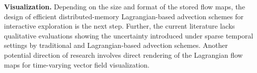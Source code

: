 \textbf{Visualization.} 
%
%
Depending on the size and format of the stored flow maps, the design of efficient distributed-memory Lagrangian-based advection schemes for interactive exploration is the next step.
%
Further, the current literature lacks qualitative evaluations showing the uncertainty introduced under sparse temporal settings by traditional and Lagrangian-based advection schemes.
%
Another potential direction of research involves direct rendering of the Lagrangian flow maps for time-varying vector field visualization. 
%
